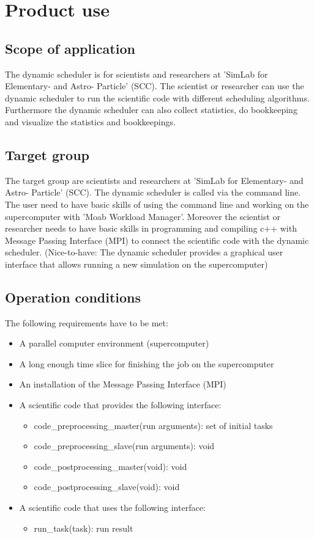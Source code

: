 \section{Product use}

\subsection{Scope of application}
The dynamic scheduler is for scientists and researchers at 'SimLab for Elementary- and Astro- Particle' (SCC). The scientist or researcher can use the dynamic scheduler to run the scientific code with different scheduling algorithms. Furthermore the dynamic scheduler can also collect statistics, do bookkeeping and visualize the statistics and bookkeepings.


\subsection{Target group}

The target group are scientists and researchers at 'SimLab for Elementary- and Astro- Particle' (SCC). The dynamic scheduler is called via the command line. The user need to have basic skills of using the command line and working on the supercomputer with 'Moab Workload Manager'. Moreover the scientist or researcher needs to have basic skills in programming and compiling c++ with Message Passing Interface (MPI) to connect the scientific code with the dynamic scheduler.
\linebreak
(Nice-to-have: The dynamic scheduler provides a graphical user interface that allows running a new simulation on the supercomputer)


\subsection{Operation conditions}

The following requirements have to be met:
\begin{itemize}
	\item A parallel computer environment (supercomputer)
	\item A long enough time slice for finishing the job on the supercomputer
	\item An installation of the Message Passing Interface (MPI)
	\item A scientific code that provides the following interface:
		\begin{itemize}
			\item code\_preprocessing\_master(run arguments): set of initial tasks
			\item code\_preprocessing\_slave(run arguments): void
			\item  code\_postprocessing\_master(void): void
			\item  code\_postprocessing\_slave(void): void
		\end{itemize}
	\item A scientific code that uses the following interface:
		\begin{itemize}
			\item run\_task(task): run result
		\end{itemize}
\end{itemize}